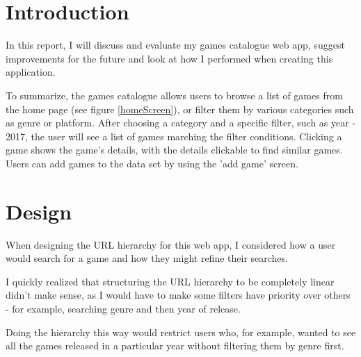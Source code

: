 \documentclass[10pt, a4paper]{article}
\title{\mytitle}
\author{\myauthor\hspace{1em}\\\contact\\Edinburgh Napier University\hspace{0.5em}-\hspace{0.5em}\mymodule}
\date{}
\newcommand{\figuremacro}[5]{
    \begin{figure}[#1]
        \centering
        \texttt{[image: \#2]}
        \caption[#3]{\textbf{#3}#4}
        \label{fig:#2}
    \end{figure}
}
\begin{document}
    \maketitle
    
    
    \section{Introduction}

    In this report, I will discuss and evaluate my games catalogue web app, suggest improvements for the future and look at how I performed when creating this application.
    
    To summarize, the games catalogue allows users to browse a list of games from the home page (see figure \ref{homeScreen}), or filter them by various categories such as genre or platform. After choosing a category and a specific filter, such as year - 2017, the user will see a list of games marching the filter conditions. Clicking a game shows the game's details, with the details clickable to find similar games. Users can add games to the data set by using the 'add game' screen.
    
    
    
	
	\section{Design}
	When designing the URL hierarchy for this web app, I considered how a user would search for a game and how they might refine their searches.
	
	I quickly realized that structuring the URL hierarchy to be completely linear didn't make sense, as I would have to make some filters have priority over others - for example, searching genre and then year of release. 
	
	Doing the hierarchy this way would restrict users who, for example, wanted to see all the games released in a particular year without filtering them by genre first.
	
\end{document}
